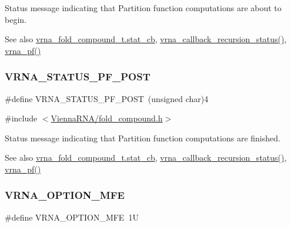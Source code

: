 Status message indicating that Partition function computations are about to begin. 

\begin{DoxySeeAlso}{See also}
\mbox{\hyperlink{group__fold__compound_a87a83f6795b569000efcbe65acc3dd81}{vrna\+\_\+fold\+\_\+compound\+\_\+t.\+stat\+\_\+cb}}, \mbox{\hyperlink{group__fold__compound_gac86036fa8cad1108832335063243cdc8}{vrna\+\_\+callback\+\_\+recursion\+\_\+status()}}, \mbox{\hyperlink{group__part__func__global_ga29e256d688ad221b78d37f427e0e99bc}{vrna\+\_\+pf()}} 
\end{DoxySeeAlso}
\mbox{\label{group__fold__compound_ga1c6fa243533fd026e50f7d595eaaa565}} 
\subsubsection{\texorpdfstring{VRNA\_STATUS\_PF\_POST}{VRNA\_STATUS\_PF\_POST}}
{\footnotesize\ttfamily \#define V\+R\+N\+A\+\_\+\+S\+T\+A\+T\+U\+S\+\_\+\+P\+F\+\_\+\+P\+O\+ST~(unsigned char)4}



{\ttfamily \#include $<$\mbox{\hyperlink{fold__compound_8h}{Vienna\+R\+N\+A/fold\+\_\+compound.\+h}}$>$}



Status message indicating that Partition function computations are finished. 

\begin{DoxySeeAlso}{See also}
\mbox{\hyperlink{group__fold__compound_a87a83f6795b569000efcbe65acc3dd81}{vrna\+\_\+fold\+\_\+compound\+\_\+t.\+stat\+\_\+cb}}, \mbox{\hyperlink{group__fold__compound_gac86036fa8cad1108832335063243cdc8}{vrna\+\_\+callback\+\_\+recursion\+\_\+status()}}, \mbox{\hyperlink{group__part__func__global_ga29e256d688ad221b78d37f427e0e99bc}{vrna\+\_\+pf()}} 
\end{DoxySeeAlso}
\mbox{\label{group__fold__compound_gae63be9127fe7dcc1f9bb14f5bb1064ee}} 
\subsubsection{\texorpdfstring{VRNA\_OPTION\_MFE}{VRNA\_OPTION\_MFE}}
{\footnotesize\ttfamily \#define V\+R\+N\+A\+\_\+\+O\+P\+T\+I\+O\+N\+\_\+\+M\+FE~1U}



